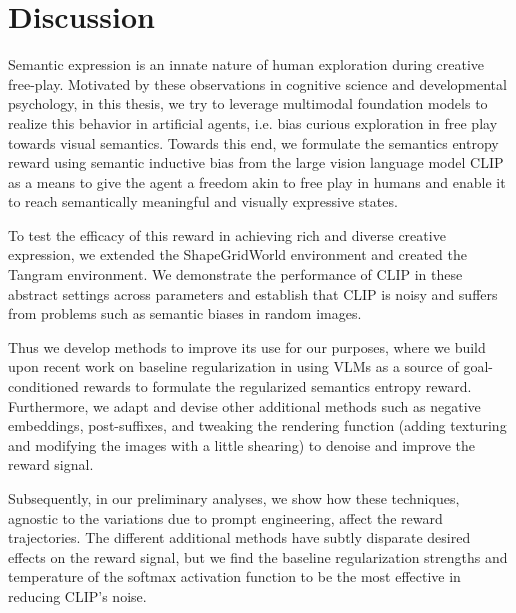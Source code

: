 \chapter{Discussion}
\label{sec:discussion}

Semantic expression is an innate nature of human exploration during creative free-play.
Motivated by these observations in cognitive science and developmental psychology, in this thesis, we try to leverage multimodal foundation models to realize this behavior in artificial agents, i.e. bias curious exploration in free play towards visual semantics.
% 
Towards this end, we formulate the semantics entropy reward using semantic inductive bias from the large vision language model CLIP as a means to give the agent a freedom akin to free play in humans and enable it to reach semantically meaningful and visually expressive states.

To test the efficacy of this reward in achieving rich and diverse creative expression, we extended the ShapeGridWorld environment and created the Tangram environment.
We demonstrate the performance of CLIP in these abstract settings across parameters and establish that CLIP is noisy and suffers from problems such as semantic biases in random images.

Thus we develop methods to improve its use for our purposes, where we build upon recent work on baseline regularization in using VLMs as a source of goal-conditioned rewards to formulate the regularized semantics entropy reward.
Furthermore, we adapt and devise other additional methods such as negative embeddings, post-suffixes, and tweaking the rendering function (adding texturing and modifying the images with a little shearing) to denoise and improve the reward signal.

Subsequently, in our preliminary analyses, we show how these techniques, agnostic to the variations due to prompt engineering, affect the reward trajectories.
The different additional methods have subtly disparate desired effects on the reward signal, but we find the baseline regularization strengths and temperature of the softmax activation function to be the most effective in reducing CLIP's noise.

